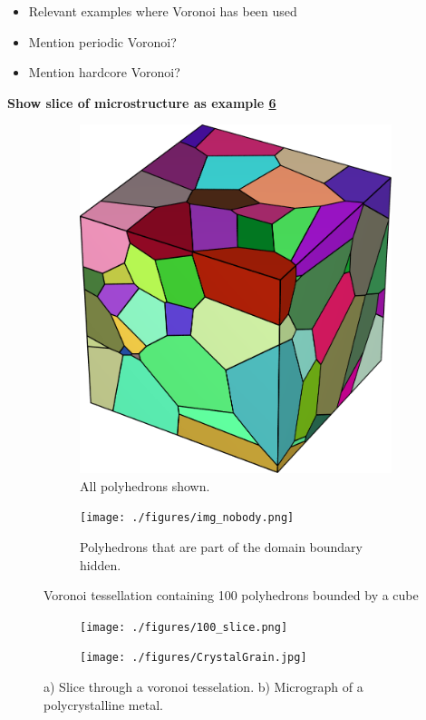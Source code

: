 \documentclass[micro_gen.tex]{subfiles}
\begin{document}
\begin{itemize}
\item Relevant examples where Voronoi has been used
\item Mention periodic Voronoi?
\item Mention hardcore Voronoi?
\end{itemize}

\textbf{Show slice of microstructure as example \ref{fig:slice}}
\cite{Fritzen2009}



\begin{figure}
\centering
\begin{subfigure}[b]{.5\textwidth}
  \centering
  \includegraphics[width=.5\linewidth]{./figures/img_body.png}
  \caption{All polyhedrons shown.}
  \label{fig:pois_voronoi_a}
\end{subfigure}%
\begin{subfigure}[b]{.5\textwidth}
  \centering
  \texttt{[image: ./figures/img\_nobody.png]}
  \caption{Polyhedrons that are part of the domain boundary hidden.}
  \label{fig:pois_voronoi_b}
\end{subfigure}
\caption{Voronoi tessellation containing 100 polyhedrons bounded by a cube}
\label{fig:pois_voronoi}
\end{figure}

\begin{figure}
\centering
\begin{subfigure}[b]{.5\textwidth}
  \centering
  \texttt{[image: ./figures/100\_slice.png]}
  \caption{}
   \label{fig:slice_a}
\end{subfigure}%
\begin{subfigure}[b]{.5\textwidth}
  \centering
  \texttt{[image: ./figures/CrystalGrain.jpg]}
  \caption{}
  \label{fig:slice_b}
\end{subfigure}
\caption{a) Slice through a voronoi tesselation.  b) Micrograph of a polycrystalline metal.\cite{wiki:grain}}
\label{fig:slice}
\end{figure}


\begin{figure}

\end{figure}
\end{document}
